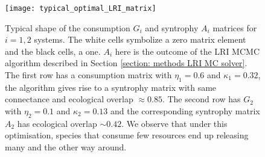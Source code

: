 \documentclass[12pt, titlepage]{report}
\begin{document}
\begin{figure}
\texttt{[image: typical\_optimal\_LRI\_matrix]}
\caption{Typical shape of the consumption $G_i$ and syntrophy $A_i$ matrices for $i=1,2$ systems. The white cells symbolize a zero matrix element and the black cells, a one. $A_i$ here is the outcome of the LRI MCMC algorithm described in Section \ref{section: methods LRI MC solver}. The first row has a consumption matrix with $\eta_1=0.6$ and $\kappa_1=0.32$, the algorithm gives rise to a syntrophy matrix with same connectance and ecological overlap $\approx 0.85$. The second row has $G_2$ with $\eta_2=0.1$ and $\kappa_2=0.13$ and the corresponding syntrophy matrix $A_2$ has ecological overlap $\sim 0.42$. We observe that under this optimisation, species that consume few resources end up releasing many and the other way around.}\label{fig: dynamical stability results typical shape of consumption syntrophy LRI algorithm}
\end{figure}
\end{document}
